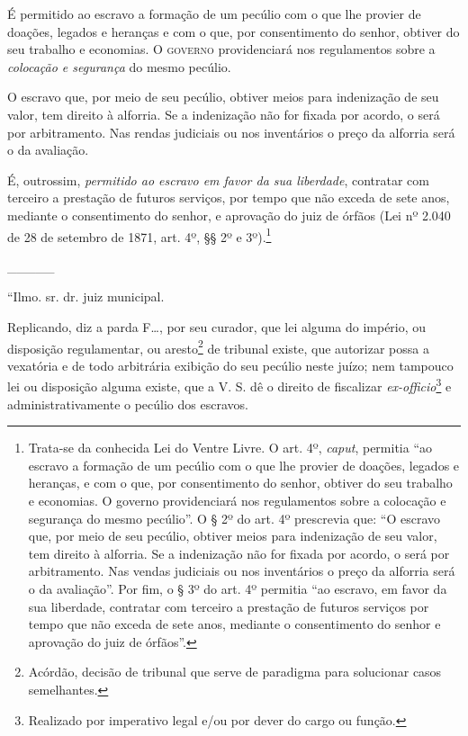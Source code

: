 {\begin{flushright}
É permitido ao escravo a formação de um pecúlio com o que lhe provier de
doações, legados e heranças e com o que, por consentimento do senhor,
obtiver do seu trabalho e economias. O \textsc{governo} providenciará nos
regulamentos sobre a \emph{colocação e segurança} do mesmo pecúlio.

O escravo que, por meio de seu pecúlio, obtiver meios para indenização
de seu valor, tem direito à alforria. Se a indenização não for fixada
por acordo, o será por arbitramento. Nas rendas judiciais ou nos
inventários o preço da alforria será o da avaliação.

É, outrossim, \emph{permitido ao escravo em favor da sua liberdade},
contratar com terceiro a prestação de futuros serviços, por tempo que
não exceda de sete anos, mediante o consentimento do senhor, e aprovação
do juiz de órfãos (Lei nº 2.040 de 28 de setembro de 1871, art. 4º, §§
2º e 3º).\footnote{ Trata-se da conhecida Lei do Ventre Livre. O art.
  4º, \emph{caput}, permitia ``ao escravo a formação de um pecúlio com o
  que lhe provier de doações, legados e heranças, e com o que, por
  consentimento do senhor, obtiver do seu trabalho e economias. O
  governo providenciará nos regulamentos sobre a colocação e segurança
  do mesmo pecúlio''. O § 2º do art. 4º prescrevia que: ``O escravo que,
  por meio de seu pecúlio, obtiver meios para indenização de seu valor,
  tem direito à alforria. Se a indenização não for fixada por acordo, o
  será por arbitramento. Nas vendas judiciais ou nos inventários o preço
  da alforria será o da avaliação''. Por fim, o § 3º do art. 4º permitia
  ``ao escravo, em favor da sua liberdade, contratar com terceiro a
  prestação de futuros serviços por tempo que não exceda de sete anos,
  mediante o consentimento do senhor e aprovação do juiz de órfãos''.}

\_\_\_\_\_

``Ilmo. sr. dr. juiz municipal.

Replicando, diz a parda F\ldots{}, por seu curador, que lei alguma do
império, ou disposição regulamentar, ou aresto\footnote{ Acórdão,
  decisão de tribunal que serve de paradigma para solucionar casos
  semelhantes.} de tribunal existe, que autorizar possa a vexatória e de
todo arbitrária exibição do seu pecúlio neste juízo; nem tampouco lei ou
disposição alguma existe, que a V. S. dê o direito de fiscalizar
\emph{ex-officio}\footnote{ Realizado por imperativo legal e/ou por
  dever do cargo ou função.} e administrativamente o pecúlio dos
escravos.


\end{flushright}}
